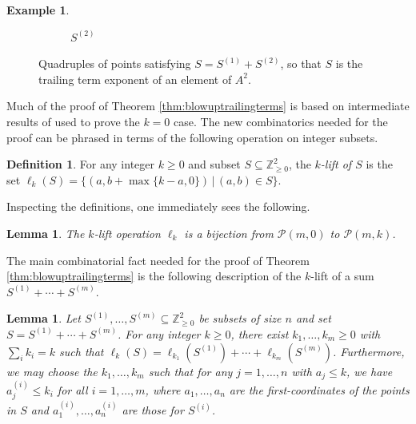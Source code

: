\documentclass[12pt]{amsart}
\newcommand{\Z}{\mathbb{Z}}
\numberwithin{equation}{section}
\newtheorem{lemma}[theorem]{Lemma}
\theoremstyle{definition}
\newtheorem{definition}[theorem]{Definition}
\newtheorem{example}[theorem]{Example}
\begin{document}
\begin{example}
\begin{figure}[h]
\begin{subfigure}{.25\textwidth}
                \caption{$S^{(2)}$}
            \end{subfigure}
        \caption{Quadruples of points satisfying $S=S^{(1)}+S^{(2)}$, so that $S$ is the trailing term exponent of an element of $A^2$.}
    \end{figure}
\end{example}

Much of the proof of Theorem \ref{thm:blowuptrailingterms} is based on intermediate results of \cite{C} used to prove the $k=0$ case. The new combinatorics needed for the proof can be phrased in terms of the following operation on integer subsets.

\begin{definition}
    For any integer $k\geq 0$ and subset $S\subseteq \Z^2_{\geq 0}$, the \textit{$k$-lift of $S$} is the set $\ell_k(S) = \{ (a,b+\max\{k-a,0\})\, | \, (a,b)\in S \}.$
\end{definition}

Inspecting the definitions, one immediately sees the following.

\begin{lemma}
The $k$-lift operation $\ell_k$ is a bijection from $\mathcal{P}(m,0)$ to $\mathcal{P}(m,k)$.
\end{lemma}

The main combinatorial fact needed for the proof of Theorem \ref{thm:blowuptrailingterms} is the following description of the $k$-lift of a sum $S^{(1)}+\cdots+S^{(m)}$.

\begin{lemma}\label{lem:liftdecomp}
    Let $S^{(1)},\dots,S^{(m)}\subseteq \Z^2_{\geq 0}$ be subsets of size $n$ and set $S = S^{(1)}+\cdots+S^{(m)}$. For any integer $k\geq 0$, there exist $k_1,\dots, k_m\geq 0$ with $\sum_i k_i =k$ such that $\ell_k(S) = \ell_{k_1}(S^{(1)})+\cdots+\ell_{k_m}(S^{(m)})$. Furthermore, we may choose the $k_1,\dots,k_m$ such that for any $j=1,\dots,n$ with $a_j\leq k$, we have $a_j^{(i)}\leq k_i$ for all $i=1,\dots,m$, where $a_1,\dots,a_n$ are the first-coordinates of the points in $S$ and $a_1^{(i)},\dots,a_n^{(i)}$ are those for $S^{(i)}$.
\end{lemma}
\end{document}
